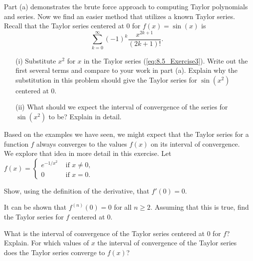 \begin{exercises}
    \item Part (a) demonstrates the brute force approach to computing Taylor polynomials and series. Now we find an easier method that utilizes a known Taylor series. Recall that the Taylor series centered at 0 for $f(x) = \sin(x)$ is
    \begin{equation} \label{eq:8.5_Exercise3}
    \sum_{k=0}^{\infty} (-1)^{k} \frac{x^{2k+1}}{(2k+1)!}.
    \end{equation}
        \begin{itemize}
        \item[(i)] Substitute $x^2$ for $x$ in the Taylor series (\ref{eq:8.5_Exercise3}). Write out the first several terms and compare to your work in part (a). Explain why the substitution in this problem should give the Taylor series for $\sin(x^2)$ centered at 0.

        \item[(ii)] What should we expect the interval of convergence of the series for $\sin(x^2)$ to be? Explain in detail.

        \end{itemize}
    \ea
    
    \item Based on the examples we have seen, we might expect that the Taylor series for a function $f$ always converges to the values $f(x)$ on its interval of convergence. We explore that idea in more detail in this exercise. Let $f(x) =
    \begin{cases}
    e^{-1/x^2} &\text{ if } x \neq 0, \\
    0   &\text{ if } x = 0.
    \end{cases}$
    \ba
    \item Show, using the definition of the derivative, that $f'(0) = 0$.
    \item It can be shown that $f^{(n)}(0) = 0$ for all $n \geq 2$. Assuming that this is true, find the Taylor series for $f$ centered at 0.
    \item What is the interval of convergence of the Taylor series centered at 0 for $f$? Explain. For which values of $x$ the interval of convergence of the Taylor series does the Taylor series converge to $f(x)$?
    \ea

\end{exercises}


\afterexercises
